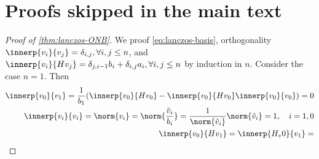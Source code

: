 \section{Proofs skipped in the main text}
\begin{proof}[Proof of \cref{thm:lanczos-ONB}]
    We proof \cref{eq:lanczos-basis}, orthogonality \(\innerp{v_i}{v_j} = \delta_{i,j}, \forall i,j \leq n\), and \(\innerp{v_i}{H v_j} = \delta_{j, i-1} b_i + \delta_{i,j} a_i, \forall i,j \leq n\) by induction in \(n\).
    Consider the case \(n=1\).
    Then 
    \begin{align}
        \innerp{v_0}{v_1} = \frac{1}{b_1} \of*{ \innerp{v_0}{H v_0} - \innerp{v_0}{H v_0} \innerp{v_0}{v_0} } = 0
        \\
        \innerp{v_i}{v_i} = \norm{v_i} = \norm{\frac{\tilde v_i}{b_i}} = \frac{1}{\norm{\tilde v_i}}\norm{\tilde v_i} = 1, \quad i = 1,0
        \\
        \innerp{v_0}{H v_1} = \innerp{H_v 0}{v_1} = 
    \end{align}
\end{proof}


